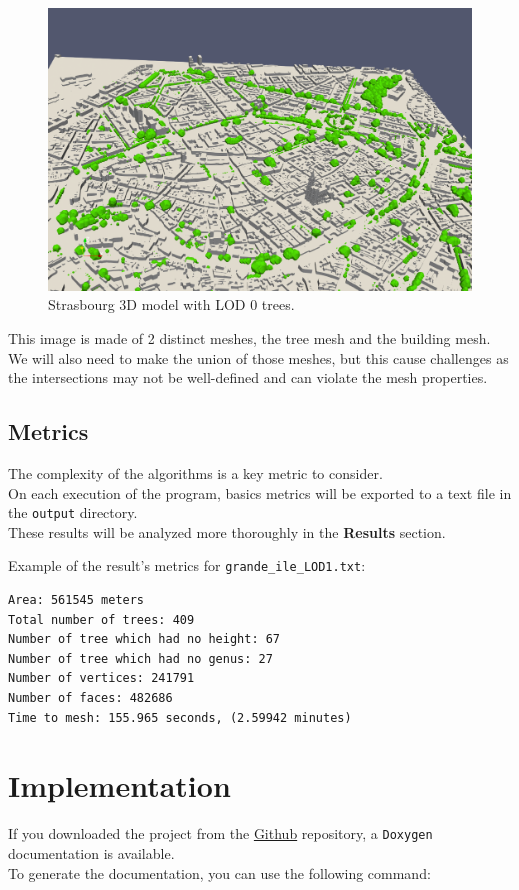 \documentclass[12pt]{article}
\begin{document}
\begin{figure}[H]
    \centering
    \includegraphics[width=1\textwidth]{images/stras_lod0.png}
    \caption{Strasbourg 3D model with LOD 0 trees.}
\end{figure}

This image is made of 2 distinct meshes, the tree mesh and the building mesh.
We will also need to make the union of those meshes, but this cause challenges 
as the intersections may not be well-defined and can violate the mesh properties.

\subsection{Metrics}
The complexity of the algorithms is a key metric to consider. \\
On each execution of the program, basics metrics will be exported to a text file in
the \texttt{output} directory. \\
These results will be analyzed more thoroughly in the \textbf{Results} section.

Example of the result's metrics for \texttt{grande\_ile\_LOD1.txt}:

\begin{lstlisting}
Area: 561545 meters
Total number of trees: 409
Number of tree which had no height: 67
Number of tree which had no genus: 27
Number of vertices: 241791
Number of faces: 482686
Time to mesh: 155.965 seconds, (2.59942 minutes)
\end{lstlisting}

\section{Implementation}
If you downloaded the project from the \href{https://github.com/master-csmi/2024-m1-vegetation}{Github}
repository, a \texttt{Doxygen} documentation is available. \\
To generate the documentation, you can use the following command:
\end{document}
